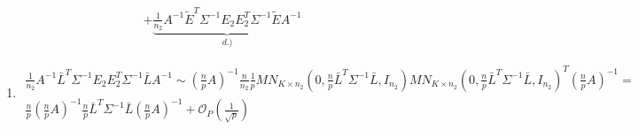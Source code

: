 \documentclass{article}
\begin{document}
\begin{enumerate}
\begin{multline}
+ \underbrace{\frac{1}{n_2}A^{-1}\tilde{E}^T\Sigma^{-1}E_2E_2^T\Sigma^{-1} \tilde{E}A^{-1}}_{d.)}
\end{multline}
	\begin{enumerate}
	\item \begin{multline}
	\frac{1}{n_2}A^{-1}\bar{L}^T\Sigma^{-1}E_2E_2^T\Sigma^{-1}\bar{L}A^{-1} \sim \left( \frac{n}{p}A \right)^{-1} \frac{n}{n_2}\frac{1}{p} MN_{K \times n_2}\left( 0, \frac{n}{p}\bar{L}^T\Sigma^{-1}\bar{L}, I_{n_2} \right) MN_{K \times n_2}\left( 0, \frac{n}{p}\bar{L}^T\Sigma^{-1}\bar{L}, I_{n_2} \right)^T \left( \frac{n}{p}A \right)^{-1} = \\
	\frac{n}{p}\left( \frac{n}{p}A \right)^{-1} \frac{n}{p}\bar{L}^T\Sigma^{-1}\bar{L} \left( \frac{n}{p}A \right)^{-1} + \mathcal{O}_P\left( \frac{1}{\sqrt{p}} \right)
	\end{multline}
	

\end{enumerate}
\end{enumerate}
\end{document}
